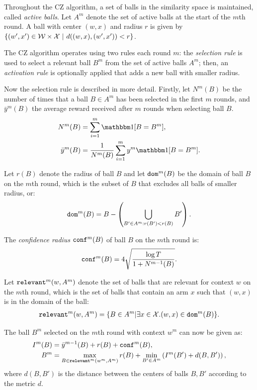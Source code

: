         Throughout the CZ algorithm, a set of balls in the similarity space is maintained, called \textit{active balls}. Let $A^m$ denote the set of active balls at the start of the $m$th round. A ball with center $(w,x)$ and radius $r$ is given by $\{(w',x')\in\cl{W}\times\cl{X}\ |\ d((w,x),(w',x')) < r \}$. 

        The CZ algorithm operates using two rules each round $m$: the \textit{selection rule} is used to select a relevant ball $B^m$ from the set of active balls $A^m$; then, an \textit{activation rule} is optionally applied that adds a new ball with smaller radius.

        Now the selection rule is described in more detail. Firstly, let $N^m(B)$ be the number of times that a ball $B\in A^m$ has been selected in the first $m$ rounds, and $\bar{y}^m(B)$ the average reward received after $m$ rounds when selecting ball $B$. 
        \begin{align}
            N^m(B) &= \sum_{i=1}^m \one[B=B^m], \label{eq:2:cz_num_ball_selected} \\
            \bar{y}^m(B) &= \frac{1}{N^m(B)} \sum_{i=1}^m y^m \one[B=B^m]. \label{eq:2:cz_ball_avg_reward}
        \end{align}

        Let $r(B)$ denote the radius of ball $B$ and let ${\textnormal{\texttt{dom}}}^m(B)$ be the domain of ball $B$ on the $m$th round, which is the subset of $B$ that excludes all balls of smaller radius, or:
        \begin{align}
            {\textnormal{\texttt{dom}}}^m(B) = B - \left( \bigcup_{B'\in A^m:r(B')<r(B)} B' \right). \label{eq:2:cz_domain}
        \end{align}

        The \textit{confidence radius} ${\textnormal{\texttt{conf}}}^m(B)$ of ball $B$ on the $m$th round is:
        \begin{align}
            {\textnormal{\texttt{conf}}}^m(B) = 4\sqrt{\frac{\log T}{1+N^{m-1}(B)}}. \label{eq:2:cz_conf_radius}
        \end{align}

        Let ${\textnormal{\texttt{relevant}}}^m(w,A^m)$ denote the set of balls that are relevant for context $w$ on the $m$th round, which is the set of balls that contain an arm $x$ such that $(w,x)$ is in the domain of the ball:
        \begin{align}
            {\textnormal{\texttt{relevant}}}^m(w,A^m) = \{ B\in A^m | \exists x\in\mathcal{X}. (w,x)\in{\textnormal{\texttt{dom}}}^m(B)\}.
        \end{align}

        The ball $B^m$ selected on the $m$th round with context $w^m$ can now be given as:
        \begin{align}
            I^m(B) &= \bar{y}^{m-1}(B) + r(B) + {\textnormal{\texttt{conf}}}^m(B), \label{eq:2:cz_pre_index} \\
            B^m &= \max_{B\in{\textnormal{\texttt{relevant}}}^m(w^m,A^m)} r(B) + \min_{B'\in A^m} \left( I^m(B') + d(B,B') \right), \label{eq:2:cz_ball_selection}
        \end{align}
        where $d(B,B')$ is the distance between the centers of balls $B,B'$ according to the metric $d$. 

